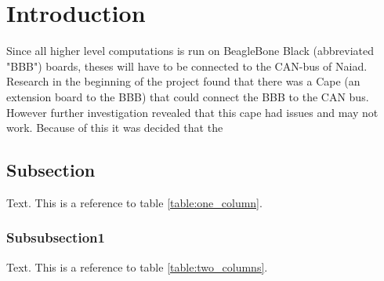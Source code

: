 \section{Introduction}\label{sec:introduction}
Since all higher level computations is run on BeagleBone Black (abbreviated "BBB") boards, theses will have to be connected to the CAN-bus of Naiad. Research in the beginning of the project found that there was a Cape (an extension board to the BBB) that could connect the BBB to the CAN bus. However further investigation revealed that this cape had issues and may not work. Because of this it was decided that the \newline
 

\subsection{Subsection}
Text. This is a reference to table \ref{table:one_column}.
\subsubsection{Subsubsection1}
Text. This is a reference to table \ref{table:two_columns}.
